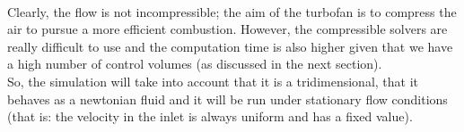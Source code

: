 \paragraph{}Clearly, the flow is not incompressible; the aim of the turbofan is to compress the air to pursue a more efficient combustion. However, the compressible solvers are really difficult to use and the computation time is also higher given that we have a high number of control volumes (as discussed in the next section). \\
So, the simulation will take into account that it is a tridimensional, that it behaves as a newtonian fluid and it will be run under stationary flow conditions (that is: the velocity in the inlet is always uniform and has a fixed value).